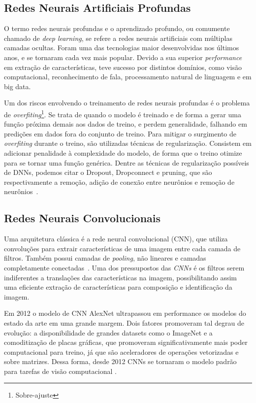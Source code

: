 \subsection{Redes Neurais Artificiais Profundas}\label{sec:Cap2_redes_neurais_profundas}
O termo redes neurais profundas e o aprendizado profundo, ou comumente chamado de \textit{deep learning}, se refere a redes neurais artificiais com múltiplas camadas ocultas. Foram uma das tecnologias maior desenvolvidas nos últimos anos, e se tornaram cada vez mais popular. Devido a sua superior \textit{performance} em extração de características, teve sucesso por distintos domínios, como visão computacional, reconhecimento de fala, processamento natural de linguagem e em big data.

Um dos riscos envolvendo o treinamento de redes neurais profundas é o problema de \textit{overfiting}\footnote{Sobre-ajuste}. Se trata de quando o modelo é treinado e de forma a gerar uma função próxima demais aos dados de treino, e perdem generalidade, falhando em predições em dados fora do conjunto de treino. Para mitigar o surgimento de \textit{overfiting} durante o treino, são utilizadas técnicas de regularização. Consistem em adicionar penalidade à complexidade do modelo, de forma que o treino otimize para se tornar uma função genérica. Dentre as técnicas de regularização possíveis de DNNs, podemos citar o Dropout, Dropconnect e pruning, que são respectivamente a remoção, adição de conexão entre neurônios e remoção de neurônios~\cite{hastie01statisticallearning}.


\subsection{Redes Neurais Convolucionais}\label{sec:Cap2_redes_neurais_convolucionais}
Uma arquitetura clássica é a rede neural convolucional (CNN), que utiliza convoluções para extrair características de uma imagem entre cada camada de filtros. Também possui camadas de \textit{pooling}, não lineares e camadas completamente conectadas~\cite{8308186}. Uma dos pressupostos das \textit{CNNs} é os filtros serem indiferentes a translações das características na imagem, possibilitando assim uma eficiente extração de características para composição e identificação da imagem.


Em 2012 o modelo de CNN AlexNet ultrapassou em performance os modelos do estado da arte em uma grande margem. Dois fatores promoveram tal degrau de evolução: a disponibilidade de grandes datasets como o ImageNet e a comoditização de placas gráficas, que promoveram significativamente mais poder computacional para treino, já que são aceleradores de operações vetorizadas e sobre matrizes. Dessa forma, desde 2012 CNNs se tornaram o modelo padrão para tarefas de visão computacional \cite{alom2018history}.

